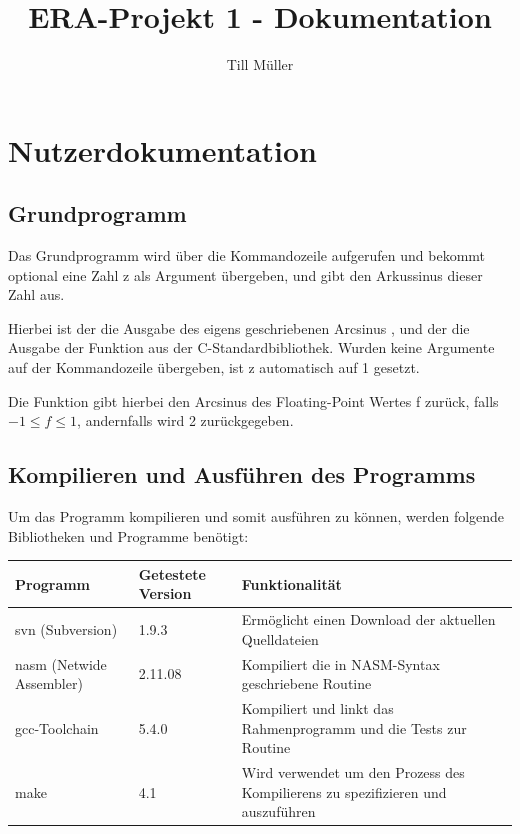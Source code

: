 \documentclass{article}
\title{ERA-Projekt 1 - Dokumentation}
\author{Till Müller}
\begin{document}
\maketitle

\tableofcontents

\newpage

\section{Nutzerdokumentation}

\subsection{Grundprogramm}

	Das Grundprogramm wird über die Kommandozeile aufgerufen und
	bekommt optional eine Zahl z als Argument übergeben, und gibt
	den Arkussinus dieser Zahl aus.

	\vspace{0.3cm}

	Hierbei ist der  die Ausgabe des eigens
	geschriebenen Arcsinus , und der  die Ausgabe der Funktion  aus
	der C-Standardbibliothek.  Wurden keine Argumente auf der
	Kommandozeile übergeben, ist z automatisch auf 1 gesetzt.

	\vspace{0.3cm}

	Die Funktion  gibt hierbei den Arcsinus
	des Floating-Point Wertes f zurück, falls \(-1\leq f \leq 1\),
	andernfalls wird 2 zurückgegeben.

	\subsection{Kompilieren und Ausführen des Programms}
	Um das Programm kompilieren und somit ausführen zu können,
	werden folgende Bibliotheken und Programme benötigt:

	\begin{tabular}{l | p{15mm} | p{60mm}}
		Programm & Getestete Version & Funktionalität\\
		\hline
		svn (Subversion) & 1.9.3 & Ermöglicht einen Download der aktuellen Quelldateien\\
		nasm (Netwide Assembler) & 2.11.08 & Kompiliert die in NASM-Syntax geschriebene Routine\\
		gcc-Toolchain & 5.4.0 & Kompiliert und linkt das Rahmenprogramm und die Tests zur Routine\\
		make & 4.1 & Wird verwendet um den Prozess des Kompilierens zu spezifizieren und auszuführen\\
	\end{tabular}
\end{document}
